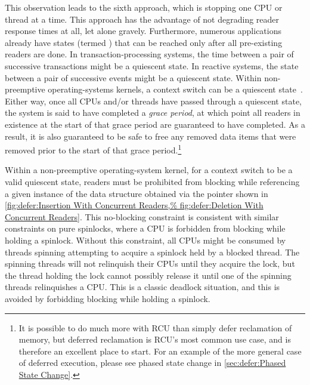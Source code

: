 This observation leads to the sixth approach, which is stopping
one CPU or thread at a time.
This approach has the advantage of not degrading reader response times
at all, let alone gravely.
Furthermore, numerous applications already have states (termed
\emph{}) that can be
reached only after all pre-existing readers are done.
In transaction-processing systems, the time between a pair of
successive transactions might be a quiescent state.
In reactive systems, the state between a pair of successive events
might be a quiescent state.
Within non-preemptive operating-systems kernels, a context switch can be
a quiescent state~\cite{McKenney98}.
Either way, once all CPUs and/or threads have passed through a quiescent
state, the system is said to have completed a \emph{grace period},
at which point all readers in existence at the start of that grace period
are guaranteed to have completed.
As a result, it is also guaranteed to be safe to free any removed data
items that were removed prior to the start of that grace period.\footnote{
	It is possible to do much more with RCU than simply defer
	reclamation of memory, but deferred reclamation is RCU's most
	common use case, and is therefore an excellent place to start.
	For an example of the more general case of deferred execution,
	please see phased state change in \cref{sec:defer:Phased State
	Change}.}

Within a non-preemptive operating-system kernel, for a context switch to be
a valid quiescent state, readers must be prohibited from blocking while
referencing a given instance of the data structure obtained via the 
pointer shown in
\cref{fig:defer:Insertion With Concurrent Readers,%
fig:defer:Deletion With Concurrent Readers}.
This no-blocking constraint is consistent with similar constraints
on pure spinlocks, where a CPU is forbidden from blocking while
holding a spinlock.
Without this constraint, all CPUs might be consumed by threads
spinning attempting to acquire a spinlock held by a blocked thread.
The spinning threads will not relinquish their CPUs until they acquire
the lock, but the thread holding the lock cannot possibly release it
until one of the spinning threads relinquishes a CPU\@.
This is a classic deadlock situation, and this  is avoided
by forbidding blocking while holding a spinlock.

